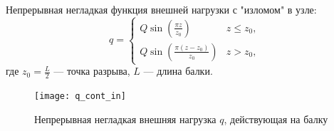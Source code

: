 \documentclass[7pt]{beamer}
\numberwithin{equation}{section}
\begin{document}
\begin{frame}{}
	Непрерывная негладкая функция внешней нагрузки с "изломом" в узле:
	\begin{equation}
		q = 
			\begin{cases}
				Q \sin \left(\frac{\pi  z}{z_{0}}\right) & z \leq z_{0}, \\
				Q \sin \left(\frac{\pi  (z-z_{0})}{z_{0}}\right) & z > z_{0},
			\end{cases}
	\end{equation}
	где $z_{0}=\frac{L}{2}$ --- точка разрыва, $L$ --- длина балки. \\
	\begin{figure}[H]
		\centering
		\texttt{[image: q\_cont\_in]}
		\caption{Непрерывная негладкая внешняя нагрузка $q$, действующая на балку}
		\label{fig:q_cont_in}
	\end{figure}
\end{frame}
\end{document}
